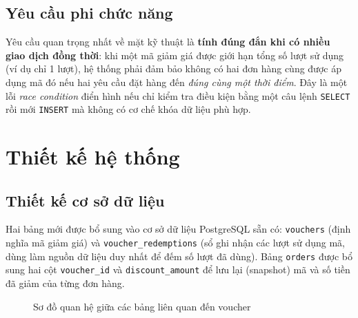\documentclass[12pt,a4paper]{article}
\begin{document}
\subsection{Yêu cầu phi chức năng}

Yêu cầu quan trọng nhất về mặt kỹ thuật là \textbf{tính đúng đắn khi có nhiều giao dịch đồng thời}: khi một mã giảm giá được giới hạn tổng số lượt sử dụng (ví dụ chỉ 1 lượt), hệ thống phải đảm bảo không có hai đơn hàng cùng được áp dụng mã đó nếu hai yêu cầu đặt hàng đến \emph{đúng cùng một thời điểm}. Đây là một lỗi \emph{race condition} điển hình nếu chỉ kiểm tra điều kiện bằng một câu lệnh \texttt{SELECT} rồi mới \texttt{INSERT} mà không có cơ chế khóa dữ liệu phù hợp.

\section{Thiết kế hệ thống}

\subsection{Thiết kế cơ sở dữ liệu}

Hai bảng mới được bổ sung vào cơ sở dữ liệu PostgreSQL sẵn có: \texttt{vouchers} (định nghĩa mã giảm giá) và \texttt{voucher\_redemptions} (sổ ghi nhận các lượt sử dụng mã, dùng làm nguồn dữ liệu duy nhất để đếm số lượt đã dùng). Bảng \texttt{orders} được bổ sung hai cột \texttt{voucher\_id} và \texttt{discount\_amount} để lưu lại (snapshot) mã và số tiền đã giảm của từng đơn hàng.

\begin{figure}[H]
\centering
{}
\caption{Sơ đồ quan hệ giữa các bảng liên quan đến voucher}
\end{figure}
\end{document}
